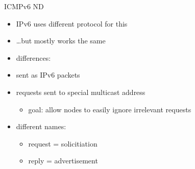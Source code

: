 \begin{frame}{ICMPv6 ND}
    \begin{itemize}
    \item IPv6 uses different protocol for this
    \item \ldots but mostly works the same
    \vspace{.5cm}
    \item differences:
    \item sent as IPv6 packets
    \item requests sent to special multicast address
        \begin{itemize}
        \item goal: allow nodes to easily ignore irrelevant requests
        \end{itemize}
    \item different names:
        \begin{itemize}
        \item request = solicitiation
        \item reply = advertisement
        \end{itemize}
    \end{itemize}
\end{frame}
